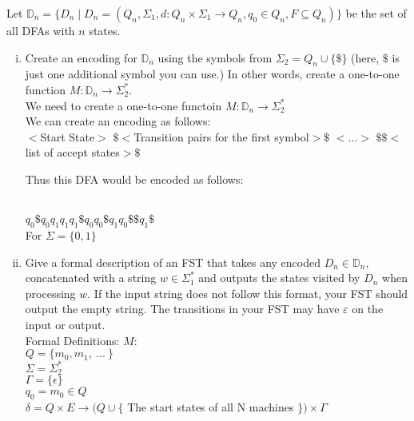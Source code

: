 \documentclass{article}
\begin{document}
\begin{enumerate}[a)]
    Let $\mathbb{D}_n=\{D_n\;|\;D_n=(Q_n,\Sigma_1,d:Q_n\times\Sigma_1\rightarrow Q_n,q_0\in Q_n,F\subseteq Q_n)\}$ be the set of all DFAs with $n$ states.
    
    \begin{enumerate}[i)]
        \item Create an encoding for $\mathbb{D}_n$ using the symbols from $\Sigma_2=Q_n \cup \{\$\}$ (here, $\$$ is just one additional symbol you can use.)  In other words, create a one-to-one function $M: \mathbb{D}_n\rightarrow\Sigma_2^{*}$.\\

We need to create a one-to-one functoin $M:\mathbb{D}_n \rightarrow \Sigma^*_2$ \\
We can create an encoding as follows: \\
$<$Start State$>$ $\$<$Transition pairs for the first symbol$>\$$ $<$...$>$ $\$\$<$
list of accept states$>\$$

Thus this DFA would be encoded as follows:\\
\\[5pt]
    $q_0\$q_0q_1q_1q_1\$q_0q_0\$q_1q_0\$\$q_1\$ $ \\
    For $\Sigma = \{ 0,1 \}$
        \item Give a formal description of an FST that takes any encoded $D_n\in\mathbb{D}_n$, concatenated with a string $w\in\Sigma_1^{*}$ and outputs the states visited by $D_n$ when processing $w$.  If the input string does not follow this format, your FST should output the empty string.  The transitions in your FST may have $\varepsilon$ on the input or output.\\

Formal Definitions:
$M:$\\
$Q=\{m_0,m_1,\ ...\ \}$\\
$\Sigma = \Sigma^*_2$ \\
$\Gamma = \{\epsilon\}$ \\
$q_0 = m_0 \in Q$ \\
$\delta = Q \times E \rightarrow (Q \cup \{$ The start states of all N machines $\}) \times \Gamma $ \\


\end{enumerate}
\end{enumerate}
\end{document}

